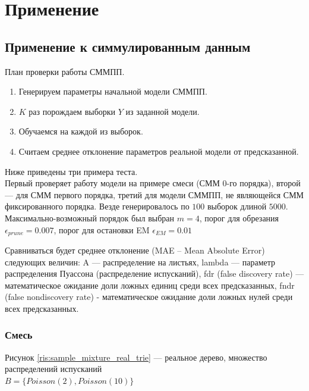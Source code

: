 \documentclass{matmex-diploma-custom}
\begin{document}
\section{Применение}
\subsection{Применение к симмулированным данным}
План проверки работы СММПП.
\begin{enumerate}
\item
Генерируем параметры начальной модели СММПП.
\item
$K$ раз порождаем выборки $ Y $ из заданной модели.
\item
Обучаемся на каждой из выборок.
\item
Считаем среднее отклонение параметров реальной модели от предсказанной. 
\end{enumerate}

Ниже приведены три примера теста.
\\Первый проверяет работу модели на примере смеси (СММ 0-го порядка), второй --- для СММ первого порядка, третий для модели СММПП, не являющейся СММ фиксированного порядка. Везде генерировалось по $100$ выборок длиной $5000$.
Максимально-возможный порядок был выбран $m=4$, порог для обрезания $ \epsilon_{\textit{prune}} = 0.007$, порог для остановки EM $\epsilon_{\textit{EM}} =  0.01 $ 

Сравниваться будет среднее отклонение (MAE -- Mean Absolute Error)
следующих величин: A --- распределение на листьях, lambda --- параметр распределения Пуассона (распределение испусканий), fdr (false discovery rate) --- математическое ожидание доли ложных единиц среди всех предсказанных, fndr (false nondiscovery rate) - математическое ожидание доли ложных нулей среди всех предсказанных. 
\subsubsection{Смесь}
Рисунок \ref{ris:sample_mixture_real_trie} --- реальное дерево, множество распределений испусканий 
\\$B = \{\textit{Poisson}(2), \textit{Poisson}(10)\}$
\end{document}
